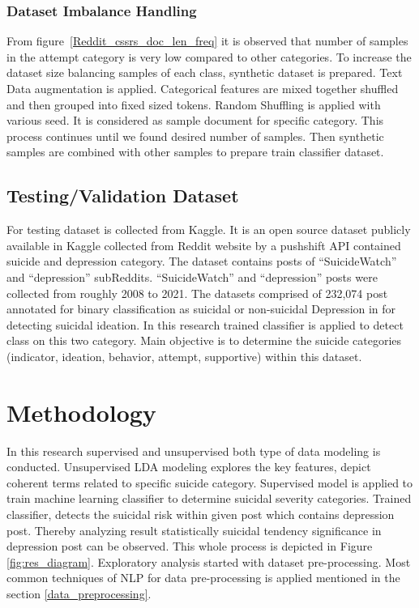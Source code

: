 \documentclass[sn-mathphys,Numbered]{sn-jnl}%
\theoremstyle{thmstyleone}%
\theoremstyle{thmstyletwo}%
\theoremstyle{thmstylethree}%
\begin{document}
\subsubsection{Dataset Imbalance Handling}
From figure~\ref{Reddit_cssrs_doc_len_freq} it is observed that number of samples in the attempt category is very low compared to other categories. To increase the dataset size balancing samples of each class, synthetic dataset is prepared. Text Data augmentation \cite{bayer2022survey} is applied.
Categorical features are mixed together shuffled and then grouped into fixed sized tokens. Random Shuffling is applied with various seed. It is considered as sample document for specific category. This process continues until we found desired number of samples. Then synthetic samples are combined with other samples to prepare train classifier dataset. 
\subsection{Testing/Validation Dataset} 
For testing dataset is collected from Kaggle. It is an open source dataset publicly available in Kaggle collected from Reddit website by a pushshift API contained suicide and depression category. The dataset contains posts of \enquote{SuicideWatch} and \enquote{depression} subReddits. \enquote{SuicideWatch} and \enquote{depression} posts were collected from roughly 2008 to 2021. The datasets comprised of 232,074 post annotated for binary classification as suicidal or non-suicidal Depression in \cite{aldhyani2022detecting} for detecting suicidal ideation. In this research trained classifier is applied to detect class on this two category. Main objective is to determine the suicide categories (indicator, ideation, behavior, attempt, supportive) within this dataset. 

\section{Methodology}\label{methodolo}
In this research supervised and unsupervised both type of data modeling is conducted. Unsupervised LDA modeling explores the key features, depict coherent terms related to specific suicide category. Supervised model is applied to train machine learning classifier to determine suicidal severity categories. Trained classifier, detects the suicidal risk within given post which contains depression post. Thereby analyzing result statistically suicidal tendency significance in depression post can be observed. This whole process is depicted in Figure \ref{fig:res_diagram}. Exploratory analysis started with dataset pre-processing. Most common techniques of NLP for data pre-processing is applied mentioned in the section \ref{data_preprocessing}. 
\end{document}
